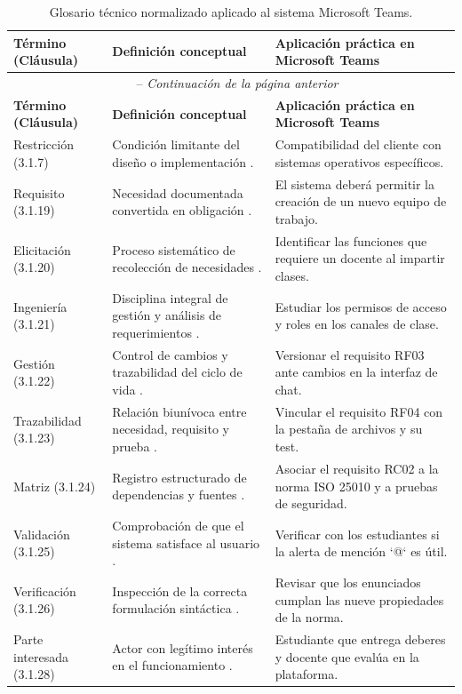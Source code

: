 \documentclass[11pt,a4paper]{article}
\begin{document}
	\begin{longtable}{p{3.0cm} p{5.0cm} p{6.8cm}}
		\caption{Glosario técnico normalizado aplicado al sistema Microsoft Teams.} \\
		\toprule
		\textbf{Término (Cláusula)} & \textbf{Definición conceptual} & \textbf{Aplicación práctica en Microsoft Teams} \\
		\midrule
		\endfirsthead
		\multicolumn{3}{c}{\tablename\ \thetable\ -- \textit{Continuación de la página anterior}} \\
		\toprule
		\textbf{Término (Cláusula)} & \textbf{Definición conceptual} & \textbf{Aplicación práctica en Microsoft Teams} \\
		\midrule
		\endhead
		\bottomrule
		\endfoot
		Restricción (3.1.7) & Condición limitante del diseño o implementación \cite{iso29148_2018}. & Compatibilidad del cliente con sistemas operativos específicos. \\
		Requisito (3.1.19) & Necesidad documentada convertida en obligación \cite{iso29148_2018}. & El sistema deberá permitir la creación de un nuevo equipo de trabajo. \\
		Elicitación (3.1.20) & Proceso sistemático de recolección de necesidades \cite{iso29148_2018}. & Identificar las funciones que requiere un docente al impartir clases. \\
		Ingeniería (3.1.21) & Disciplina integral de gestión y análisis de requerimientos \cite{iso29148_2018}. & Estudiar los permisos de acceso y roles en los canales de clase. \\
		Gestión (3.1.22) & Control de cambios y trazabilidad del ciclo de vida \cite{iso29148_2018}. & Versionar el requisito RF03 ante cambios en la interfaz de chat. \\
		Trazabilidad (3.1.23) & Relación biunívoca entre necesidad, requisito y prueba \cite{iso29148_2018}. & Vincular el requisito RF04 con la pestaña de archivos y su test. \\
		Matriz (3.1.24) & Registro estructurado de dependencias y fuentes \cite{iso29148_2018}. & Asociar el requisito RC02 a la norma ISO 25010 y a pruebas de seguridad. \\
		Validación (3.1.25) & Comprobación de que el sistema satisface al usuario \cite{iso29148_2018}. & Verificar con los estudiantes si la alerta de mención `@` es útil. \\
		Verificación (3.1.26) & Inspección de la correcta formulación sintáctica \cite{iso29148_2018}. & Revisar que los enunciados cumplan las nueve propiedades de la norma. \\
		Parte interesada (3.1.28) & Actor con legítimo interés en el funcionamiento \cite{iso29148_2018}. & Estudiante que entrega deberes y docente que evalúa en la plataforma. \\
		\bottomrule
	\end{longtable}
	
\end{document}
